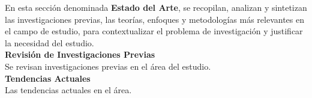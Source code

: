 
En esta sección denominada \textbf{Estado del Arte}, se recopilan, analizan y sintetizan las investigaciones previas, las teorías, enfoques y metodologías más relevantes en el campo de estudio, para contextualizar el problema de investigación y justificar la necesidad del estudio. \cite{dirac} \\
\textbf{{Revisión de Investigaciones Previas}} \\
Se revisan investigaciones previas en el área del estudio. \\
\textbf{{Tendencias Actuales}}\\
Las tendencias actuales en el área.

